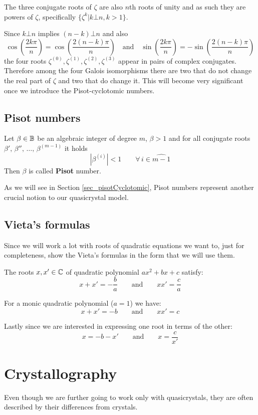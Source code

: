 \documentclass[text.tex]{subfiles}
\begin{document}
The three conjugate roots of $\zeta$ are also $n$th roots of unity and as such they are powers of $\zeta$, specifically $\{\zeta^k|k\bot n, k>1\}$. 

Since $k\bot n$ implies $(n-k)\bot n$ and also
$$\cos\left(\frac{2k\pi}{n}\right) = \cos\left(\frac{2\left(n-k\right)\pi}{n}\right) \quad\text{and}\quad \sin\left(\frac{2k\pi}{n}\right) = -\sin\left(\frac{2\left(n-k\right)\pi}{n}\right)$$
the four roots $\zeta^{(0)}, \zeta^{(1)}, \zeta^{(2)}, \zeta^{(3)}$ appear in pairs of complex conjugates. Therefore among the four Galois isomorphisms there are two that do not change the real part of $\zeta$ and two that do change it. This will become very significant once we introduce the Pisot-cyclotomic numbers. 

\subsection{Pisot numbers}
\begin{definition}
Let $\beta\in\mathbb{B}$ be an algebraic integer of degree $m$, $\beta>1$  and for all conjugate roots $\beta',\,\beta'',\,\dots ,\,\beta^{(m-1)}$ it holds
$$|\beta^{(i)}|<1\qquad \forall\, i\in\widehat{m-1}$$
Then $\beta$ is called \textbf{Pisot} number.
\end{definition}

As we will see in Section \ref{sec_pisotCyclotomic}, Pisot numbers represent another crucial notion to our quasicrystal model. 

\subsection{Vieta's formulas}
Since we will work a lot with roots of quadratic equations we want to, just for completeness, show the Vieta's formulas in the form that we will use them. 

The roots $x,x'\in\mathbb{C}$ of quadratic polynomial $ax^2+bx+c$ satisfy: 
$$x+x'=-\frac{b}{a}\qquad\text{and}\qquad xx'=\frac{c}{a}$$

For a monic quadratic polynomial ($a=1$) we have:
$$x+x'=-b\qquad\text{and}\qquad xx'=c$$

Lastly since we are interested in expressing one root in terms of the other: 
$$x=-b-x'\qquad\text{and}\qquad x=\frac{c}{x'}$$


\section{Crystallography}\label{sec_crystallography}%
Even though we are further going to work only with quasicrystals, they are often described by their differences from crystals. 
\end{document}
